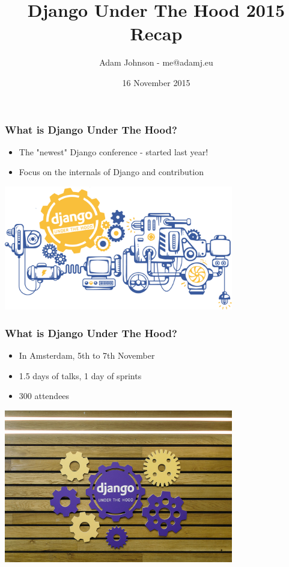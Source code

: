 \documentclass{beamer}
\title{Django Under The Hood 2015 Recap}
\author{Adam Johnson - me@adamj.eu}
\date{16 November 2015}
\begin{document}
\maketitle


\begin{frame}[fragile]\frametitle{What is Django Under The Hood?}

    \begin{itemize}
        \item The "newest" Django conference - started last year!
        \item Focus on the internals of Django and contribution
    \end{itemize}

    \begin{center}
        \includegraphics[width=10cm]{duth-header}
    \end{center}

\end{frame}


\begin{frame}[fragile]\frametitle{What is Django Under The Hood?}

    \begin{itemize}
        \item In Amsterdam, 5th to 7th November
        \item 1.5 days of talks, 1 day of sprints
        \item 300 attendees
    \end{itemize}

    \begin{center}
        \includegraphics[width=10cm]{duth-cogs}
    \end{center}

\end{frame}
\end{document}
